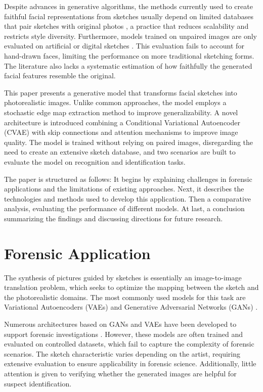 \documentclass{IEEEcsmag}
\begin{document}
Despite advances in generative algorithms, the methods currently used to create faithful facial representations from sketches usually depend on limited databases that pair sketches with original photos \cite{10466756, bushra2021}, a practice that reduces scalability and restricts style diversity. Furthermore, models trained on unpaired images are only evaluated on artificial or digital sketches \cite{li2020}. This evaluation fails to account for hand-drawn faces, limiting the performance on more traditional sketching forms. The literature also lacks a systematic estimation of how faithfully the generated facial features resemble the original.

This paper presents a generative model that transforms facial sketches into photorealistic images. Unlike common approaches, the model employs a stochastic edge map extraction method to improve generalizability. A novel architecture is introduced combining a Conditional Variational Autoencoder (CVAE) with skip connections \cite{he2016} and attention mechanisms \cite{oktay2022} to improve image quality. The model is trained without relying on paired images, disregarding the need to create an extensive sketch database, and two scenarios are built to evaluate the model on recognition and identification tasks.

The paper is structured as follows: It begins by explaining challenges in forensic applications and the limitations of existing approaches. Next, it describes the technologies and methods used to develop this application. Then a comparative analysis, evaluating the performance of different models. At last, a conclusion summarizing the findings and discussing directions for future research.


\section{Forensic Application}
\label{sec:related}

\smallskip

The synthesis of pictures guided by sketches is essentially an image-to-image translation problem, which seeks to optimize the mapping between the sketch and the photorealistic domains. The most commonly used models for this task are Variational Autoencoders (VAEs) and Generative Adversarial Networks (GANs) \cite{pang2022}.

Numerous architectures based on GANs and VAEs have been developed to support forensic investigations \cite{bushra2021,sun2022, di2017, junior2024sketch}. However, these models are often trained and evaluated on controlled datasets, which fail to capture the complexity of forensic scenarios. The sketch characteristic varies depending on the artist, requiring extensive evaluation to ensure applicability in forensic science. Additionally, little attention is given to verifying whether the generated images are helpful for suspect identification. 
\end{document}

